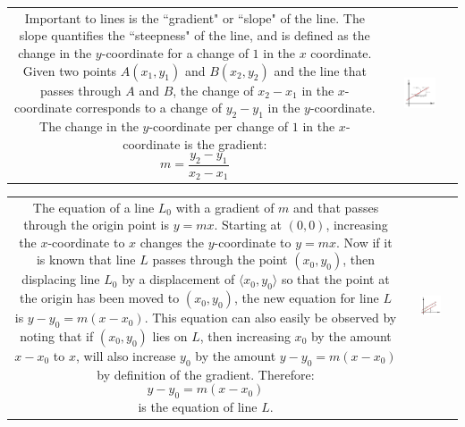 \documentclass{article}
\begin{document}
\begin{tabular}{cc}
\parbox{0.5\textwidth}{
Important to lines is the ``gradient" or ``slope" of the line. The slope quantifies the ``steepness" of the line, and is defined as the change in the \(y\)-coordinate for a change of \(1\) in the \(x\) coordinate. Given two points \(A(x_1, y_1)\) and \(B(x_2, y_2)\) and the line that passes through \(A\) and \(B\), the change of \(x_2 - x_1\) in the \(x\)-coordinate corresponds to a change of \(y_2 - y_1\) in the \(y\)-coordinate. The change in the \(y\)-coordinate per change of \(1\) in the \(x\)-coordinate is the gradient: 
\[m = \frac{y_2 - y_1}{x_2 - x_1}\] 
} & \parbox{0.5\textwidth}{
\includegraphics[width = 0.5\textwidth]{gradient}
}
\end{tabular}

\begin{tabular}{cc}
\parbox{0.5\textwidth}{
The equation of a line \(L_0\) with a gradient of \(m\) and that passes through the origin point is \(y = mx\). Starting at \((0,0)\), increasing the \(x\)-coordinate to \(x\) changes the \(y\)-coordinate to \(y = mx\). Now if it is known that line \(L\) passes through the point \((x_0, y_0)\), then displacing line \(L_0\) by a displacement of \(\langle x_0, y_0 \rangle\) so that the point at the origin has been moved to \((x_0, y_0)\), the new equation for line \(L\) is \(y - y_0 = m(x - x_0)\). This equation can also easily be observed by noting that if \((x_0, y_0)\) lies on \(L\), then increasing \(x_0\) by the amount \(x - x_0\) to \(x\), will also increase \(y_0\) by the amount \(y - y_0 = m(x - x_0)\) by definition of the gradient. Therefore:
\[y - y_0 = m(x - x_0)\] 
is the equation of line \(L\).
} & \parbox{0.5\textwidth}{
\includegraphics[width = 0.5\textwidth]{gradient_3}
}
\end{tabular}
\end{document}
